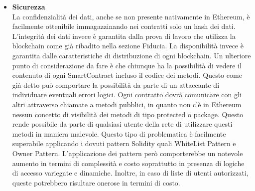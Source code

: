 \begin{itemize}
    Lo studio Gartner\footcite{farah:The-Dawn-of-Decentralized-Identity} evidenzia come in una rete permissionless la tracciabilità temporale non sia possibile, questo perchè in una rete distribuita ogni nodo può avere un concetto di tempo proprio. Questo però non risulta possibile in nessun approccia risolutivo all’ITF basato su blockchain, infatti le reti permissioned applicano timestamp a livello di blocco e non di transazione. Anche ammettendo che ci sia un concetto di tempo comune tra i nodi, le transizioni rimarrebbero temporalmente non tracciabili. La cosa potrebbe permettere ad un blocco di alterare l’ordine delle transazioni. 
    Tale complicazione in una rete permissioned può essere superata creando blocchi immutabili e ogni qual volta si voglia fare una modifica, si dovrà creare un nuovo blocco. In questo modo ci sarà solo una transazione di creazione blocco il cui timestamp coinciderà con il timestamp del blocco.
    L' approccio in Ethereum rimane in ogni caso impraticabile. Attualmente non sono note ulteriori tecniche per la tracciabilità temporale in Ethereum, motivo per cui l’attribuzione di un riferimento temporale dovrà essere effettuato lato client, con i conseguenti limiti di sicurezza. 
    \item \textbf{Sicurezza}\\
    La confidenzialità dei dati, anche se non presente nativamente in Ethereum, è facilmente ottenibile immagazzinando nei contratti solo un hash dei dati.
    L’integrità dei dati invece è garantita dalla prova di lavoro che utilizza la blockchain come già ribadito nella sezione Fiducia.
    La disponibilità invece è garantita dalle caratteristiche di distribuzione di ogni blockchain.
    Un ulteriore punto di considerazione da fare è che chiunque ha la possibilità di vedere il contenuto di ogni SmartContract incluso il codice dei metodi. Questo come già detto può comportare la possibilità da parte di un attaccante di individuare eventuali errori logici. Ogni contratto dovrà comunicare con gli altri attraverso chiamate a metodi pubblici, in quanto non c’è in Ethereum nessun concetto di visibilità dei metodi di tipo protected o package. Questo rende possibile da parte di qualsiasi utente della rete di utilizzare questi metodi in maniera malevole. Questo tipo di problematica è facilmente superabile applicando i dovuti pattern Solidity quali WhiteList Pattern e Owner Pattern. L’applicazione dei pattern però comporterebbe un notevole aumento in termini di complessità e costo soprattutto in presenza di logiche di accesso variegate e dinamiche. Inoltre, in caso di liste di utenti autorizzati, queste potrebbero risultare onerose in termini di costo.

\end{itemize}
